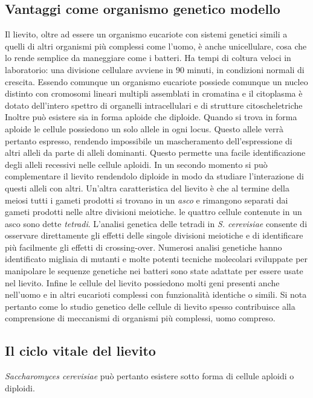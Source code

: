 	\subsection*{Vantaggi come organismo genetico modello}
	Il lievito, oltre ad essere un organismo eucariote con sistemi genetici simili a quelli di altri organismi pi\`u complessi come l'uomo, \`e anche unicellulare, cosa che lo rende semplice da maneggiare come i batteri.
	Ha tempi di coltura veloci in laboratorio: una divisione cellulare avviene in $90$ minuti, in condizioni normali di crescita.
	Essendo comunque un organismo eucariote possiede comunque un nucleo distinto con cromosomi lineari multipli assemblati in cromatina e il citoplasma \`e dotato dell'intero spettro di organelli intracellulari e di strutture citoscheletriche
	Inoltre pu\`o esistere sia in forma aploide che diploide.
	Quando si trova in forma aploide le cellule possiedono un solo allele in ogni locus.
	Questo allele verr\`a pertanto espresso, rendendo impossibile un mascheramento dell'espressione di altri alleli da parte di alleli dominanti.
	Questo permette una facile identificazione degli alleli recessivi nelle cellule aploidi.
	In un secondo momento si pu\`o complementare il lievito rendendolo diploide in modo da studiare l'interazione di questi alleli con altri.
	Un'altra caratteristica del lievito \`e che al termine della meiosi tutti i gameti prodotti si trovano in un \emph{asco} e rimangono separati dai gameti prodotti nelle altre divisioni meiotiche.
	le quattro cellule contenute in un asco sono dette \emph{tetradi}.
	L'analisi genetica delle tetradi in \emph{S. cerevisiae} consente di osservare direttamente gli effetti delle singole divisioni meiotiche e di identificare pi\`u facilmente gli effetti di crossing-over.
	Numerosi analisi genetiche hanno identificato migliaia di mutanti e molte potenti tecniche molecolari sviluppate per manipolare le sequenze genetiche nei batteri sono state adattate per essere usate nel lievito.
	Infine le cellule del lievito possiedono molti geni presenti anche nell'uomo e in altri eucarioti complessi con funzionalit\`a identiche o simili.
	Si nota pertanto come lo studio genetico delle cellule di lievito spesso contribuisce alla comprensione di meccanismi di organismi pi\`u complessi, uomo compreso.

	\subsection*{Il ciclo vitale del lievito}
	\emph{Saccharomyces cerevisiae} pu\`o pertanto esistere sotto forma di cellule aploidi o diploidi.

